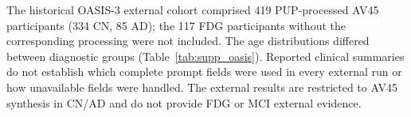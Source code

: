 The historical OASIS-3 external cohort comprised 419 PUP-processed AV45 participants (334 CN, 85 AD); the 117 FDG participants without the corresponding processing were not included. The age distributions differed between diagnostic groups (Table~\ref{tab:supp_oasis}). Reported clinical summaries do not establish which complete prompt fields were used in every external run or how unavailable fields were handled. The external results are restricted to AV45 synthesis in CN/AD and do not provide FDG or MCI external evidence.
